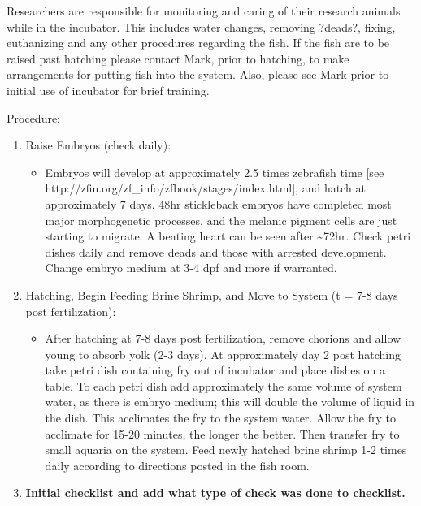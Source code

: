 \documentclass[
  letterpaper,
  DIV=11,
  numbers=noendperiod]{scrreprt}
\providecommand{\tightlist}{%
  \setlength{\itemsep}{0pt}\setlength{\parskip}{0pt}}\usepackage{longtable,booktabs,array}
\begin{document}
\begin{tcolorbox}[enhanced jigsaw, rightrule=.15mm, title=\textcolor{quarto-callout-important-color}{\faExclamation}\hspace{0.5em}{This is important}, titlerule=0mm, opacitybacktitle=0.6, toprule=.15mm, bottomrule=.15mm, opacityback=0, left=2mm, colframe=quarto-callout-important-color-frame, breakable, coltitle=black, colback=white, colbacktitle=quarto-callout-important-color!10!white, bottomtitle=1mm, leftrule=.75mm, toptitle=1mm, arc=.35mm]

Researchers are responsible for monitoring and caring of their research
animals while in the incubator. This includes water changes, removing
?deads?, fixing, euthanizing and any other procedures regarding the
fish. If the fish are to be raised past hatching please contact Mark,
prior to hatching, to make arrangements for putting fish into the
system. Also, please see Mark prior to initial use of incubator for
brief training.

\end{tcolorbox}

Procedure:

\begin{enumerate}
\def\labelenumi{\arabic{enumi}.}
\item
  Raise Embryos (check daily):

  \begin{itemize}
  \tightlist
  \item
    Embryos will develop at approximately 2.5 times zebrafish time
    {[}see http://zfin.org/zf\_info/zfbook/stages/index.html{]}, and
    hatch at approximately 7 days. 48hr stickleback embryos have
    completed most major morphogenetic processes, and the melanic
    pigment cells are just starting to migrate. A beating heart can be
    seen after \textasciitilde72hr. Check petri dishes daily and remove
    deads and those with arrested development. Change embryo medium at
    3-4 dpf and more if warranted.
  \end{itemize}
\item
  Hatching, Begin Feeding Brine Shrimp, and Move to System (t = 7-8 days
  post fertilization):

  \begin{itemize}
  \tightlist
  \item
    After hatching at 7-8 days post fertilization, remove chorions and
    allow young to absorb yolk (2-3 days). At approximately day 2 post
    hatching take petri dish containing fry out of incubator and place
    dishes on a table. To each petri dish add approximately the same
    volume of system water, as there is embryo medium; this will double
    the volume of liquid in the dish. This acclimates the fry to the
    system water. Allow the fry to acclimate for 15-20 minutes, the
    longer the better. Then transfer fry to small aquaria on the system.
    Feed newly hatched brine shrimp 1-2 times daily according to
    directions posted in the fish room.
  \end{itemize}
\item
  \textbf{Initial checklist and add what type of check was done to
  checklist.}
\end{enumerate}
\end{document}
